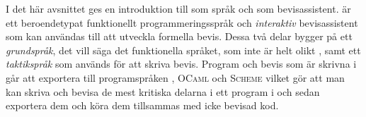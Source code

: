 I det här avsnittet ges en introduktion till \coq{} som språk och som
bevisassistent. \coq{} är ett beroendetypat funktionellt programmeringsspråk
och \emph{interaktiv} bevisassistent som kan användas till att utveckla
formella bevis. Dessa två delar bygger på ett \emph{grundspråk}, det vill säga
det funktionella språket, som inte är helt olikt \haskell{}, samt ett
\emph{taktikspråk} som används för att skriva bevis. Program och bevis som är
skrivna i \coq{} går att exportera till programspråken \haskell{},
\textsc{OCaml} och \textsc{Scheme} vilket gör att man kan skriva och bevisa de
mest kritiska delarna i ett program i \coq{} och sedan exportera dem och köra
dem tillsammas med icke bevisad kod.
